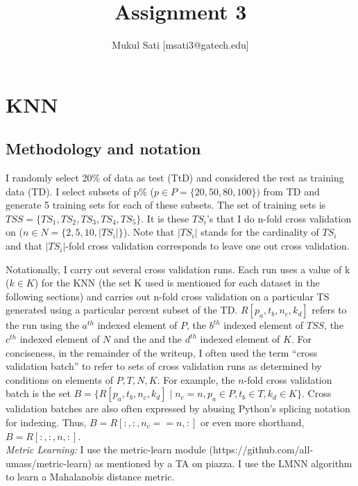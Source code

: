 \documentclass[5pt]{article}
\begin{document}
\title{Assignment 3}
\author{Mukul Sati [msati3@gatech.edu]}
\maketitle

\section{KNN}
\subsection{Methodology and notation}

I randomly select 20\% of data as test (TtD) and considered the rest as
training data (TD). I select subsets of p\% ($p \in P =\{20, 50, 80, 100\})$
from TD and generate 5 training sets for each of these subsets. The set of
training sets is $TSS = \{TS_1, TS_2, TS_3, TS_4, TS_5\}$. It is these $TS_i$'s
that I do n-fold cross validation on ($n \in N =\{2, 5, 10, |TS_i|\}$). Note
that $|TS_i|$ stands for the cardinality of $TS_i$ and that $|TS_i|$-fold cross
validation corresponds to leave one out cross validation.

Notationally, I carry out several cross validation runs. Each run uses a value
of k ($k \in K$) for the KNN (the set K used is mentioned for each dataset in
the following sections) and carries out n-fold cross validation on a particular
TS generated using a particular percent subset of the TD\@.
$R[p_a,t_b,n_c,k_d]$ refers to the run using the $a^{th}$ indexed element of
$P$, the $b^{th}$ indexed element of $TSS$, the $c^{th}$ indexed element of $N$
and the and the $d^{th}$ indexed element of $K$. For conciseness, in the
remainder of the writeup, I often used the term ``cross validation batch'' to
refer to sets of cross validation runs as determined by conditions on elements
of $P, T, N, K$. For example, the $n$-fold cross validation batch is the set $B
= \{R[p_a,t_b,n_c,k_d] \mid n_c=n, p_a \in P, t_b \in T, k_d \in K\}$. Cross
validation batches are also often expressed by abusing Python's splicing
notation for indexing. Thus, $B = R[:,:,n_c==n,:]$ or even more shorthand, $B =
R[:,:,n,:]$.\\

\noindent \emph{Metric Learning:} I use the metric-learn module
(https://github.com/all-umass/metric-learn) as mentioned by a TA on piazza. I
use the LMNN algorithm to learn a Mahalanobis distance metric.\\
\end{document}
